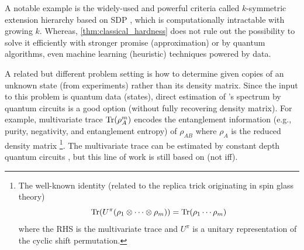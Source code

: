 \documentclass[
aps,
pra,
twocolumn,
floatfix,
]{revtex4-2}
\theoremstyle{plain}
\theoremstyle{definition}
\newcommand{\dm}{\rho}
\newcommand{\U}{U}
\begin{document}
A notable example is the widely-used and powerful criteria called $k$-symmetric extension hierarchy based on SDP \cite{navascuesPowerSymmetricExtensions2009}, 
which is computationally intractable with growing $k$.
Whereas, \cref{thm:classical_hardness} does not rule out the possibility to solve it efficiently with stronger promise (approximation) or by quantum algorithms, even machine learning (heuristic) techniques powered by data.


A related but different problem setting is how to determine  given copies of an unknown state (from experiments) rather than its density matrix.
Since the input to this problem is quantum data (states), direct estimation of 's spectrum by quantum circuits is a good option (without fully recovering density matrix).
For example, multivariate trace $\Tr(\dm_A^m)$ encodes the entanglement information (e.g., purity, negativity, and entanglement entropy) of $\dm_{AB}$ where $\dm_A$ is the  reduced density matrix
 \cite{ekertDirectEstimationsLinear2002} \cite{horodeckiDirectDetectionQuantum2002}
\footnote{
	The well-known identity (related to the replica trick originating in spin glass theory)
	\begin{equation}
		\Tr(\U^{\pi} (\dm_1 \otimes \cdots \otimes \dm_m) ) = 
		\Tr(\dm_1\cdots \dm_m)
	\end{equation}
	where the RHS is the multivariate trace and $\U^{\pi}$ is a unitary representation of the cyclic shift permutation.
}.
The multivariate trace can be estimated by constant depth quantum circuits \cite{johriEntanglementSpectroscopyQuantum2017}  \cite{quekMultivariateTraceEstimation2022}, but this line of work is still based on  (not iff).
\end{document}
